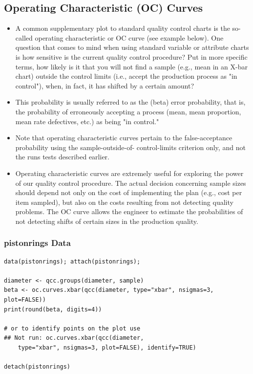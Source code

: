 \documentclass[]{article}
\begin{document}
\subsection{Operating Characteristic (OC) Curves}
\begin{itemize}
\item A common supplementary plot to standard quality control charts is the so-called operating characteristic or OC curve (see example below). One question that comes to mind when using standard variable or attribute charts is how sensitive is the current quality control procedure? Put in more specific terms, how likely is it that you will not find a sample (e.g., mean in an X-bar chart) outside the control limits (i.e., accept the production process as "in control"), when, in fact, it has shifted by a certain amount? 

\item This probability is usually referred to as the  (beta) error probability, that is, the probability of erroneously accepting a process (mean, mean proportion, mean rate defectives, etc.) as being "in control." 

\item Note that operating characteristic curves pertain to the false-acceptance probability using the sample-outside-of- control-limits criterion only, and not the runs tests described earlier.


\item Operating characteristic curves are extremely useful for exploring the power of our quality control procedure. The actual decision concerning sample sizes should depend not only on the cost of implementing the plan (e.g., cost per item sampled), but also on the costs resulting from not detecting quality problems. The OC curve allows the engineer to estimate the probabilities of not detecting shifts of certain sizes in the production quality.
\end{itemize}






\newpage
\subsubsection{pistonrings Data}
\begin{framed}
\begin{verbatim}
data(pistonrings); attach(pistonrings);

diameter <- qcc.groups(diameter, sample)
beta <- oc.curves.xbar(qcc(diameter, type="xbar", nsigmas=3, plot=FALSE))
print(round(beta, digits=4))

# or to identify points on the plot use
## Not run: oc.curves.xbar(qcc(diameter, 
    type="xbar", nsigmas=3, plot=FALSE), identify=TRUE)

detach(pistonrings)
\end{verbatim}
\end{framed}
\end{document}
